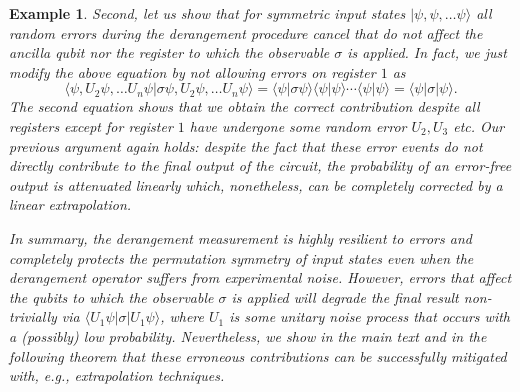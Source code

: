 \documentclass[aps,prx,showpacs,twocolumn,reprint]{revtex4-2}
\newtheorem{example}{Example}
\begin{document}
{\begin{example}
	Second, let us show that for symmetric input states $| \psi, \psi,  \dots \psi \rangle$
	all random errors during the derangement procedure cancel that do
	not affect the ancilla qubit nor the register to which the observable $\sigma$
	is applied. In fact, we just modify the above equation by not allowing
	errors on register $1$ as
	\begin{equation*} 
	\langle \psi, U_{2} \psi,  \dots U_{n} \psi	| \sigma  \psi, U_2 \psi,  \dots U_n \psi \rangle
	=\langle \psi |\sigma \psi \rangle \langle  \psi| \psi \rangle \cdots \langle \psi | \psi \rangle
	= \langle \psi |\sigma | \psi \rangle.
	\end{equation*}	
	The second equation shows that we obtain the correct contribution
	despite all registers except for register $1$ have undergone some
	random error $U_2, U_3$ etc. Our previous argument again holds:
	despite the fact that these error events do not directly contribute to the final output of the circuit,
	the probability of an error-free output is attenuated linearly which,
	nonetheless, can be completely corrected by a linear extrapolation.
	
	In summary, the derangement measurement is highly
	resilient to errors and completely protects the permutation
	symmetry of input states even when the derangement operator
	suffers from experimental noise. However, errors that affect the
	qubits to which the observable $\sigma$ is applied will degrade
	the final result \emph{non-trivially} via $\langle U_1 \psi |\sigma | U_1 \psi \rangle$,
	where $U_1$ is some unitary noise process that occurs with a (possibly)
	low probability. 	
	Nevertheless, we show in the main text and
	in the following theorem that these erroneous contributions can be successfully
	mitigated with, e.g.,  extrapolation techniques. 
	
	
\end{example}








}
\end{document}
